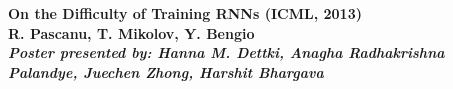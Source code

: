 \documentclass[final]{beamer}
\begin{document}
\begin{frame}[t]



\begin{center}
  \noindent
  \colorbox{nyuviolet}{\parbox{\textwidth}{\centering
    \color{white}
    \Huge\bfseries On the Difficulty of Training RNNs (ICML, 2013)\\[0.5em]
    \Large R. Pascanu, T. Mikolov, Y. Bengio\\[0.7em]
    \large \textit{Poster presented by: Hanna M. Dettki, Anagha Radhakrishna Palandye, Juechen Zhong, Harshit Bhargava}
  }}
\end{center}




\end{frame}
\end{document}
